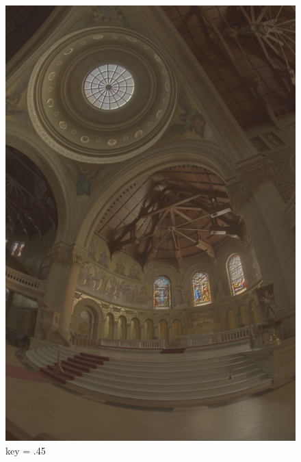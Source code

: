 \documentclass{article}
\begin{document}
\begin{figure}[!htb]
      \includegraphics[scale=.27]{./data/3/avar/4_5.jpg}
      \caption{key = .45}
    \endminipage\hfill

\end{figure}
\end{document}
